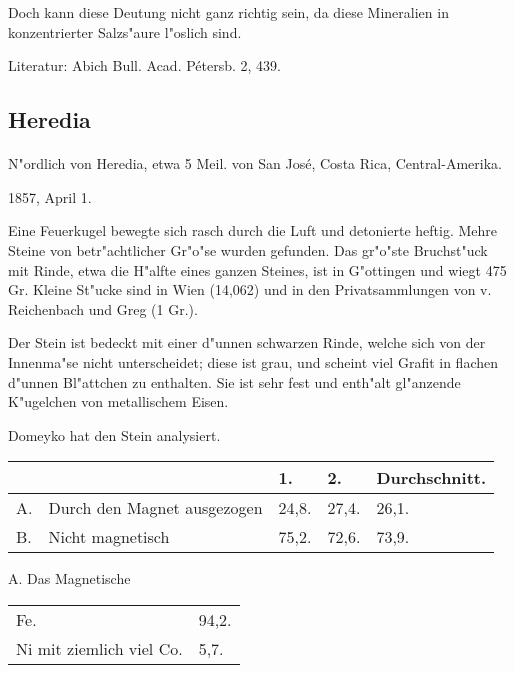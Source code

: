 \documentclass[a4paper, 11pt, oneside]{article}
\begin{document}
Doch kann diese Deutung nicht ganz richtig sein, da diese Mineralien in konzentrierter Salzs"aure l"oslich sind.

\footnotesize
Literatur: Abich Bull. Acad. Pétersb. 2, 439.

\subsection{Heredia}
\normalsize
\paragraph{}
N"ordlich von Heredia, etwa 5 Meil. von San José, Costa Rica, Central-Amerika.

1857, April 1.

Eine Feuerkugel bewegte sich rasch durch die Luft und detonierte heftig. Mehre Steine von betr"achtlicher Gr"o"se wurden gefunden. Das gr"o"ste Bruchst"uck mit Rinde, etwa die H"alfte eines ganzen Steines, ist in G"ottingen und wiegt 475 Gr. Kleine St"ucke sind in Wien (14,062) und in den Privatsammlungen von v. Reichenbach und Greg (1 Gr.).

Der Stein ist bedeckt mit einer d"unnen schwarzen Rinde, welche sich von der Innenma"se nicht unterscheidet; diese ist grau, und scheint viel Grafit in flachen d"unnen Bl"attchen zu enthalten. Sie ist sehr fest und enth"alt gl"anzende K"ugelchen von metallischem Eisen.

Domeyko hat den Stein analysiert.

\begin{table}[H]
    \centering
    \begin{tabular}{l l l l l}
        ~ & ~ & 1. & 2. & Durchschnitt. \\ \hline
        A. & Durch den Magnet ausgezogen  & 24,8. & 27,4. & 26,1. \\
        B. & Nicht magnetisch & 75,2. & 72,6. & 73,9. \\
    \end{tabular}
\end{table}

\begin{center}
A. Das Magnetische
\end{center}

\begin{table}[H]
    \centering
    \begin{tabular}{l l}
        Fe. & 94,2. \\
        Ni mit ziemlich viel Co. & 5,7.\\ 
    \end{tabular}
\end{table}
\end{document}
